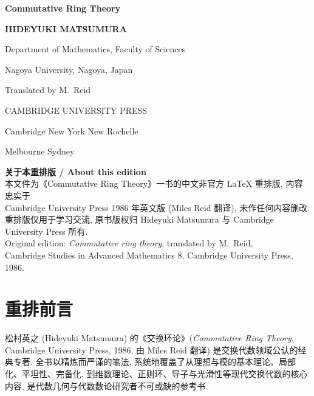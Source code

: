 \documentclass[11pt,a4paper,openright,twoside]{book}
\theoremstyle{plain}
\theoremstyle{definition}
\theoremstyle{remark}
\begin{document}
\frontmatter

\begin{titlepage}
    \begin{center}
        \vspace*{2cm}
        {\Huge\bfseries Commutative Ring Theory\par}
        \vspace{1.5cm}
        {\Large\bfseries HIDEYUKI MATSUMURA\par}
        \vspace{0.5cm}
        {\large Department of Mathematics, Faculty of Sciences\par}
        {\large Nagoya University, Nagoya, Japan\par}
        \vspace{0.7cm}
        {\large Translated by M.\ Reid\par}
        \vfill
        {\large CAMBRIDGE UNIVERSITY PRESS\par}
        \vspace{0.5cm}
        {\large Cambridge \textbullet{} New York \textbullet{} New Rochelle\par}
        {\large Melbourne \textbullet{} Sydney\par}
    \end{center}
\end{titlepage}

\thispagestyle{empty}
\begin{center}
    \small
    \noindent\textbf{关于本重排版 / About this edition}\\[0.5em]
    本文件为《Commutative Ring Theory》一书的中文非官方 \LaTeX{} 重排版, 内容忠实于\\
    Cambridge University Press 1986 年英文版 (Miles Reid 翻译), 未作任何内容删改.\\
    重排版仅用于学习交流, 原书版权归 Hideyuki Matsumura 与 Cambridge University Press 所有.\\
    \vspace{0.5cm}
    Original edition: \textit{Commutative ring theory}, translated by M.\ Reid,\\
    Cambridge Studies in Advanced Mathematics 8, Cambridge University Press, 1986.
\end{center}

\newpage
\pagestyle{plain}
\chapter*{重排前言}
松村英之 (Hideyuki Matsumura) 的《交换环论》(\textit{Commutative Ring Theory}, Cambridge University Press, 1986, 由 Miles Reid 翻译) 是交换代数领域公认的经典专著. 全书以精炼而严谨的笔法, 系统地覆盖了从理想与模的基本理论、局部化、平坦性、完备化, 到维数理论、正则环、导子与光滑性等现代交换代数的核心内容, 是代数几何与代数数论研究者不可或缺的参考书.
\end{document}
